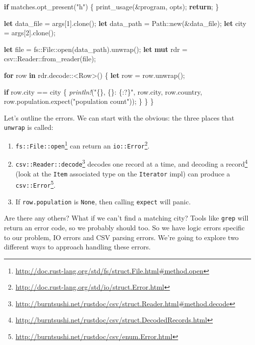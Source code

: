 \documentclass[a4paper,]{book}
\newenvironment{Shaded}{\begin{snugshade}}{\end{snugshade}}
\newcommand{\KeywordTok}[1]{\textcolor[rgb]{0.13,0.29,0.53}{\textbf{{#1}}}}
\newcommand{\DecValTok}[1]{\textcolor[rgb]{0.00,0.00,0.81}{{#1}}}
\newcommand{\StringTok}[1]{\textcolor[rgb]{0.31,0.60,0.02}{{#1}}}
\newcommand{\PreprocessorTok}[1]{\textcolor[rgb]{0.56,0.35,0.01}{\textit{{#1}}}}
\newcommand{\NormalTok}[1]{{#1}}
\renewcommand{\href}[2]{#2\footnote{\url{#1}}}
\providecommand{\tightlist}{%
  \setlength{\itemsep}{0pt}\setlength{\parskip}{0pt}}
\begin{document}
\begin{Shaded}
\begin{Highlighting}[]
    \KeywordTok{if} \NormalTok{matches.opt_present(}\StringTok{"h"}\NormalTok{) \{}
        \NormalTok{print_usage(&program, opts);}
        \KeywordTok{return}\NormalTok{;}
    \NormalTok{\}}

    \KeywordTok{let} \NormalTok{data_file = args[}\DecValTok{1}\NormalTok{].clone();}
    \KeywordTok{let} \NormalTok{data_path = Path::new(&data_file);}
    \KeywordTok{let} \NormalTok{city = args[}\DecValTok{2}\NormalTok{].clone();}

    \KeywordTok{let} \NormalTok{file = fs::File::open(data_path).unwrap();}
    \KeywordTok{let} \KeywordTok{mut} \NormalTok{rdr = csv::Reader::from_reader(file);}

    \KeywordTok{for} \NormalTok{row }\KeywordTok{in} \NormalTok{rdr.decode::<Row>() \{}
        \KeywordTok{let} \NormalTok{row = row.unwrap();}

        \KeywordTok{if} \NormalTok{row.city == city \{}
            \PreprocessorTok{println!}\NormalTok{(}\StringTok{"\{\}, \{\}: \{:?\}"}\NormalTok{,}
                \NormalTok{row.city, row.country,}
                \NormalTok{row.population.expect(}\StringTok{"population count"}\NormalTok{));}
        \NormalTok{\}}
    \NormalTok{\}}
\NormalTok{\}}
\end{Highlighting}
\end{Shaded}

Let's outline the errors. We can start with the obvious: the three
places that \texttt{unwrap} is called:

\begin{enumerate}
\def\labelenumi{\arabic{enumi}.}
\tightlist
\item
  \href{http://doc.rust-lang.org/std/fs/struct.File.html\#method.open}{\texttt{fs::File::open}}
  can return an
  \href{http://doc.rust-lang.org/std/io/struct.Error.html}{\texttt{io::Error}}.
\item
  \href{http://burntsushi.net/rustdoc/csv/struct.Reader.html\#method.decode}{\texttt{csv::Reader::decode}}
  decodes one record at a time, and
  \href{http://burntsushi.net/rustdoc/csv/struct.DecodedRecords.html}{decoding
  a record} (look at the \texttt{Item} associated type on the
  \texttt{Iterator} impl) can produce a
  \href{http://burntsushi.net/rustdoc/csv/enum.Error.html}{\texttt{csv::Error}}.
\item
  If \texttt{row.population} is \texttt{None}, then calling
  \texttt{expect} will panic.
\end{enumerate}

Are there any others? What if we can't find a matching city? Tools like
\texttt{grep} will return an error code, so we probably should too. So
we have logic errors specific to our problem, IO errors and CSV parsing
errors. We're going to explore two different ways to approach handling
these errors.
\end{document}
